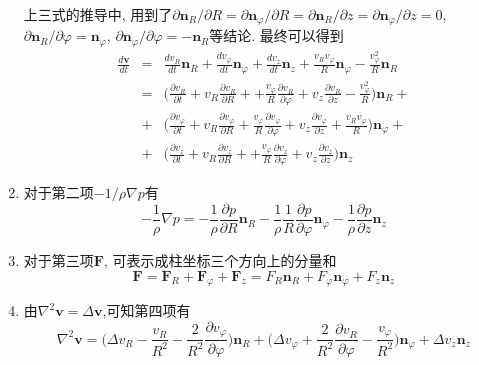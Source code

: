 \begin{solution}
\begin{enumerate}
上三式的推导中, 用到了$\partial\mathbf{n}_R/\partial R = \partial\mathbf{n}_\varphi/\partial R=\partial\mathbf{n}_R/\partial z =  \partial\mathbf{n}_\varphi/\partial z= 0$, $\partial\mathbf{n}_R/\partial\varphi = \mathbf{n}_\varphi$, $\partial\mathbf{n}_\varphi/\partial\varphi = -\mathbf{n}_R$等结论. 最终可以得到
{\setlength\arraycolsep{2pt}
\begin{eqnarray}
\frac{d\mathbf{v}}{dt}
& = & \frac{dv_R}{dt}\mathbf{n}_R
+ \frac{dv_\varphi}{dt}\mathbf{n}_\varphi + \frac{dv_z}{dt}\mathbf{n}_z + \frac{v_Rv_\varphi}{R}\mathbf{n}_\varphi-\frac{v_\varphi ^2}{R}\mathbf{n}_R \nonumber\\
& = &
\Big(\frac{\partial v_R}{\partial t} +
       v_R\frac{\partial v_R}{\partial R} +
    +  \frac{v_\varphi}{R}\frac{\partial v_R}{\partial\varphi}+v_z\frac{\partial v_R}{\partial z} -\frac{v_\varphi ^2}{R}\Big)\mathbf{n}_R + \nonumber\\
& + &
\Big(\frac{\partial v_\varphi}{\partial t} +
       v_R\frac{\partial v_\varphi}{\partial R}
    +  \frac{v_\varphi}{R}\frac{\partial v_\varphi}{\partial\varphi}+v_z\frac{\partial v_\varphi}{\partial z}+\frac{v_Rv_\varphi}{R}\Big)\mathbf{n}_\varphi + \nonumber\\
& +& \Big(\frac{\partial v_z}{\partial t} +
       v_R\frac{\partial v_z}{\partial R} +
    +  \frac{v_\varphi}{R}\frac{\partial v_z}{\partial\varphi}+v_z\frac{\partial v_z}{\partial z}\Big)\mathbf{n}_z
\end{eqnarray}}

\item 对于第二项$-1/\rho\nabla p$有
\begin{equation}
-\frac{1}{\rho}\nabla p =
-\frac{1}{\rho}\frac{\partial p}{\partial R}\mathbf{n}_R
-\frac{1}{\rho}\frac{1}{R}\frac{\partial p}{\partial\varphi}\mathbf{n}_\varphi
-\frac{1}{\rho}\frac{\partial p}{\partial z}\mathbf{n}_z
\end{equation}
\item 对于第三项$\mathbf{F}$, 可表示成柱坐标三个方向上的分量和
\begin{equation}
\mathbf{F} = \mathbf{F}_R + \mathbf{F}_\varphi + \mathbf{F}_z = F_R\mathbf{n}_R + F_\varphi\mathbf{n}_\varphi + F_z\mathbf{n}_z
\end{equation}

\item 由$\nabla^2\mathbf{v}=\Delta\mathbf{v}$,可知第四项有
\[
\nabla^2\mathbf{v}= \Big(
\Delta v_R - \frac{v_R}{R^2} - \frac{2}{R^2}\frac{\partial v_\varphi}{\partial\varphi}
\Big)\mathbf{n}_R
+\Big(
\Delta v_\varphi + \frac{2}{R^2}\frac{\partial v_R}{\partial\varphi}-\frac{v_\varphi}{R^2}
\Big)\mathbf{n}_\varphi
+\Delta v_z\mathbf{n}_z
\]


\end{enumerate}
\end{solution}
